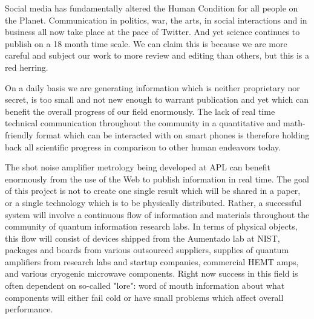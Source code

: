 \documentclass[11pt]{article}
\begin{document}
    Social media has fundamentally altered the Human Condition for all people on the Planet.  Communication in politics, war, the arts, in social interactions and in business all now take place at the pace of Twitter.  And yet science continues to publish on a 18 month time scale.  We can claim this is because we are more careful and subject our work to more review and editing than others, but this is a red herring.  




    On a daily basis we are generating information which is neither proprietary nor secret, is too small and not new enough to warrant publication and yet which can benefit the overall progress of our field enormously.  The lack of real time technical communication throughout the community in a quantitative and math-friendly format which can be interacted with on smart phones is therefore holding back all scientific progress in comparison to other human endeavors today.  




    The shot noise amplifier metrology being developed at APL can benefit enormously from the use of the Web to publish information in real time.  The goal of this project is not to create one single result which will be shared in a paper, or a single technology which is to be physically distributed.  Rather, a successful system will involve a continuous flow of information and materials throughout the community of quantum information research labs.  In terms of physical objects, this flow will consist of devices shipped from the Aumentado lab at NIST, packages and boards from various outsourced suppliers, supplies of quantum amplifiers from research labs and startup companies, commercial HEMT amps, and various cryogenic microwave components.  Right now success in this field is often dependent on so-called "lore": word of mouth information about what components will either fail cold or have small problems which affect overall performance. 
\end{document}
